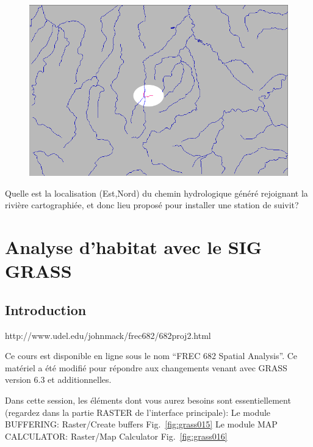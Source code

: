 \begin{figure}[htbp]
   \centering
   \includegraphics[scale=0.35]{grass014.png}
   \caption{}
   \label{fig:grass014}
\end{figure}

Quelle est la localisation (Est,Nord) du chemin hydrologique g\'en\'er\'e rejoignant la rivi\`ere cartographi\'ee, et donc lieu propos\'e pour installer une station de suivit?

\section{Analyse d'habitat avec le SIG GRASS}
\subsection{Introduction}

http://www.udel.edu/johnmack/frec682/682proj2.html

Ce cours est disponible en ligne sous le nom ``FREC 682 Spatial Analysis''. Ce mat\'eriel a \'et\'e modifi\'e pour r\'epondre aux changements venant avec GRASS  version 6.3 et additionnelles.

Dans cette session, les \'el\'ements dont vous aurez besoins sont essentiellement (regardez dans la partie RASTER de l'interface principale): 
Le module BUFFERING:   Raster/Create buffers Fig.~\ref{fig:grass015}
Le module MAP CALCULATOR:   Raster/Map Calculator Fig.~\ref{fig:grass016}

